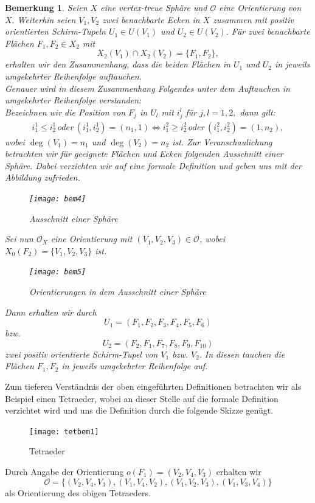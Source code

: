 \documentclass[12pt,titlepage,twoside,cleardoublepage]{article}
\theoremstyle{nummermitklammern}
\newtheorem{bemerkung}[temp]{Bemerkung}
\newtheorem{bemerkung}[zahl]{Bemerkung}
\numberwithin{equation}{section}
\begin{document}
\begin{bemerkung}\label{pos}
Seien $X$ eine vertex-treue Sphäre und $\mathcal{O}$ eine Orientierung von $X.$ Weiterhin seien $V_1,V_2$ zwei benachbarte Ecken in $X$ zusammen mit positiv orientierten Schirm-Tupeln $U_1\in U(V_1)$ und $U_2\in U(V_2).$ Für zwei benachbarte Flächen $F_1,F_2\in X_2$ mit 
\[
X_2(V_1)\cap X_2(V_2)=\{F_1,F_2\},
\]
erhalten wir den Zusammenhang, dass die beiden Flächen in $U_1$ und $U_2$ in jeweils umgekehrter Reihenfolge auftauchen.\\
Genauer wird in diesem Zusammenhang Folgendes unter dem Auftauchen in umgekehrter Reihenfolge verstanden:\\ 
Bezeichnen wir die Position von $F_j$ in $U_l$ mit $i_j^l$ für $j,l=1,2,$ dann gilt:
\begin{align*}
i^1_1\leq i_2^1 \, oder \, (i_1^1,i^1_2)=(n_1,1)\Leftrightarrow i^2_1\geq i_2^2 \, oder \, (i_1^2,i^2_2)=(1,n_2),
\end{align*}
wobei $\deg(V_1)=n_1$ und $\deg(V_2)=n_2$ ist.
Zur Veranschaulichung betrachten wir für geeignete Flächen und Ecken folgenden Ausschnitt einer Sphäre. Dabei verzichten wir auf eine formale Definition und geben uns mit der Abbildung zufrieden. 
\begin{figure}[H]
\begin{center}
\texttt{[image: bem4]}
\end{center}
\caption{Ausschnitt einer Sphäre}
\end{figure}
Sei nun $\mathcal{O}_X$ eine Orientierung mit $(V_1,V_2,V_3)\in \mathcal{O}$, wobei $X_0(F_2)=\{V_1,V_2,V_3\}$ ist.
\begin{figure}[H]
\begin{center}
\texttt{[image: bem5]}
\end{center}
\caption{Orientierungen in dem Ausschnitt einer Sphäre}
\end{figure}

Dann erhalten wir durch 
\[
U_1=(F_1,F_2,F_3,F_4,F_5,F_6)
\]
bzw.
\[
U_2=(F_2,F_1,F_7,F_8,F_9,F_{10})
\]
zwei positiv orientierte Schirm-Tupel von $V_1$ bzw. $V_2.$ In diesen tauchen die Flächen $F_1,F_2$ in jeweils umgekehrter Reihenfolge auf. 
\end{bemerkung}
Zum tieferen Verständnis der oben eingeführten Definitionen betrachten wir als Beispiel einen Tetraeder, wobei an dieser Stelle auf die formale Definition verzichtet wird und uns die Definition durch die folgende Skizze genügt.
\begin{figure}[H]
\begin{center}
\texttt{[image: tetbem1]}
\end{center}
\caption{Tetraeder}
\end{figure} 
Durch Angabe der Orientierung $o(F_1)=(V_2,V_4,V_3)$ erhalten wir
\[
\mathcal{O}=\{(V_2,V_4,V_3),(V_1,V_4,V_2),(V_1,V_2,V_3),(V_1,V_3,V_4)\}
\] 
als Orientierung des obigen Tetraeders.
 
\end{document}
